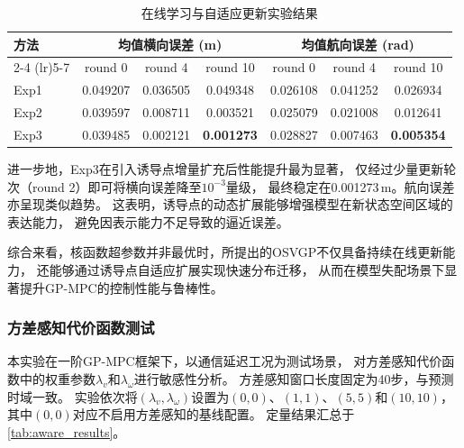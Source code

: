 \begin{table}[htbp]
\centering
\caption{在线学习与自适应更新实验结果}
\label{tab:online_learning}
\begin{tabular}{lcccccc}
\toprule
\multirow{2}{*}{方法} & \multicolumn{3}{c}{均值横向误差 (m)} & \multicolumn{3}{c}{均值航向误差 (rad)} \\
\cmidrule(lr){2-4} \cmidrule(lr){5-7}
 & round 0 & round 4 & round 10 & round 0 & round 4 & round 10 \\
\midrule
Exp1 
& 0.049207 & 0.036505 & 0.049348 
& 0.026108 & 0.041252 & 0.026934 \\

Exp2 
& 0.039597 & 0.008711 & 0.003521 
& 0.025079 & 0.021008 & 0.012641 \\

Exp3 
& 0.039485 & 0.002121 & \textbf{0.001273} 
& 0.028827 & 0.007463 & \textbf{0.005354} \\
\bottomrule
\end{tabular}
\end{table}

进一步地，Exp3在引入诱导点增量扩充后性能提升最为显著，
仅经过少量更新轮次（round 2）即可将横向误差降至$10^{-3}$量级，
最终稳定在0.001273\,m。航向误差亦呈现类似趋势。
这表明，诱导点的动态扩展能够增强模型在新状态空间区域的表达能力，
避免因表示能力不足导致的逼近误差。

综合来看，核函数超参数并非最优时，所提出的OSVGP不仅具备持续在线更新能力，
还能够通过诱导点自适应扩展实现快速分布迁移，
从而在模型失配场景下显著提升GP-MPC的控制性能与鲁棒性。

\subsubsection{方差感知代价函数测试}

本实验在一阶GP-MPC框架下，以通信延迟工况为测试场景，
对方差感知代价函数中的权重参数$\lambda_v$和$\lambda_\omega$进行敏感性分析。
方差感知窗口长度固定为40步，与预测时域一致。
实验依次将$(\lambda_v, \lambda_\omega)$设置为$(0,0)$、$(1,1)$、$(5,5)$和$(10,10)$，
其中$(0,0)$对应不启用方差感知的基线配置。
定量结果汇总于\autoref{tab:aware_results}。


